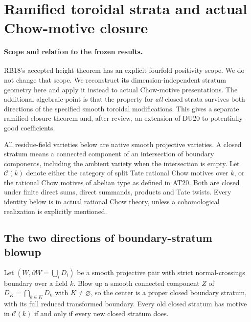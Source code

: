 \section{Ramified toroidal strata and actual Chow-motive closure}
\label{r20rt:section}

\paragraph{Scope and relation to the frozen results.}
RB18's accepted height theorem has an explicit fourfold positivity
scope.  We do not change that scope.  We reconstruct its
dimension-independent stratum geometry here and apply it instead
to actual Chow-motive presentations.  The additional algebraic
point is that the property for \emph{all} closed strata survives
both directions of the specified smooth toroidal modifications.
This gives a separate ramified closure theorem and, after review,
an extension of DU20 to potentially-good coefficients.

All residue-field varieties below are native smooth projective
varieties.  A closed stratum means a connected component of an
intersection of boundary components, including the ambient variety
when the intersection is empty.  Let $\mathcal C(k)$ denote
either the category of split Tate rational Chow motives over $k$,
or the rational Chow motives of abelian type as defined in AT20.
Both are closed under finite direct sums, direct summands,
products and Tate twists.  Every identity below is in actual
rational Chow theory, unless a cohomological realization is
explicitly mentioned.

\subsection{The two directions of boundary-stratum blowup}

\begin{lemma}
\label{r20rt:reversible}
Let $(W,\partial W=\bigcup_iD_i)$ be a smooth projective pair
with strict normal-crossings boundary over a field $k$.
Blow up a smooth connected component $Z$ of $D_K=\bigcap_{k\in K}D_k$
with $K\ne\varnothing$, so the center is a proper closed boundary
stratum, with its full reduced transformed boundary.  Every old closed
stratum has motive in $\mathcal C(k)$ if and only if every new
closed stratum does.
\end{lemma}


